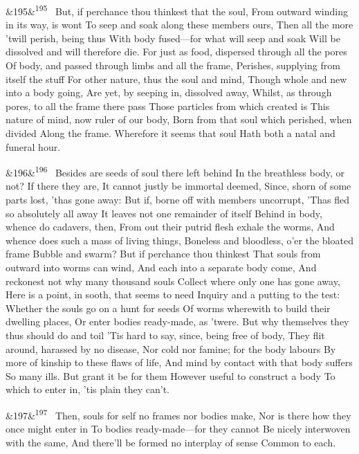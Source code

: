 \documentclass[12pt]{article}
\newcommand{\para}[1][]{\par\noindent\ifx&#1&\else\textsuperscript{\footnotesize #1}~\fi}
\begin{document}
\para[195] But, if perchance thou thinkest that the soul, From outward winding in its way, is wont To seep and soak along these members ours, Then all the more 'twill perish, being thus With body fused---for what will seep and soak Will be dissolved and will therefore die. For just as food, dispersed through all the pores Of body, and passed through limbs and all the frame, Perishes, supplying from itself the stuff For other nature, thus the soul and mind, Though whole and new into a body going, Are yet, by seeping in, dissolved away, Whilst, as through pores, to all the frame there pass Those particles from which created is This nature of mind, now ruler of our body, Born from that soul which perished, when divided Along the frame. Wherefore it seems that soul Hath both a natal and funeral hour.

\para[196] Besides are seeds of soul there left behind In the breathless body, or not? If there they are, It cannot justly be immortal deemed, Since, shorn of some parts lost, 'thas gone away: But if, borne off with members uncorrupt, 'Thas fled so absolutely all away It leaves not one remainder of itself Behind in body, whence do cadavers, then, From out their putrid flesh exhale the worms, And whence does such a mass of living things, Boneless and bloodless, o'er the bloated frame Bubble and swarm? But if perchance thou thinkest That souls from outward into worms can wind, And each into a separate body come, And reckonest not why many thousand souls Collect where only one has gone away, Here is a point, in sooth, that seems to need Inquiry and a putting to the test: Whether the souls go on a hunt for seeds Of worms wherewith to build their dwelling places, Or enter bodies ready-made, as 'twere. But why themselves they thus should do and toil 'Tis hard to say, since, being free of body, They flit around, harassed by no disease, Nor cold nor famine; for the body labours By more of kinship to these flaws of life, And mind by contact with that body suffers So many ills. But grant it be for them However useful to construct a body To which to enter in, 'tis plain they can't.

\para[197] Then, souls for self no frames nor bodies make, Nor is there how they once might enter in To bodies ready-made---for they cannot Be nicely interwoven with the same, And there'll be formed no interplay of sense Common to each.
\end{document}
